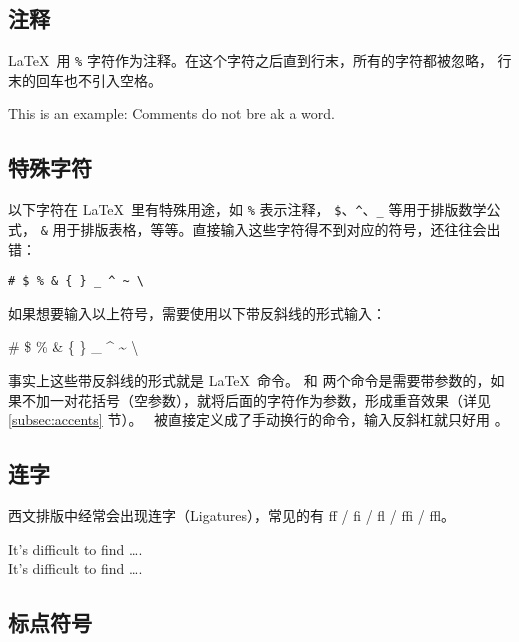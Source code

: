 \subsection{注释}\label{subsec:comments}

\LaTeX\ 用 \texttt\% 字符作为注释。在这个字符之后直到行末，所有的字符都被忽略，
行末的回车也不引入空格。
\begin{example}
This is an %
example: Comments do not bre%
ak a word.
\end{example}

\subsection{特殊字符}\label{subsec:special-chars}

以下字符在 \LaTeX\ 里有特殊用途，如 \texttt\% 表示注释， \texttt\$、\texttt\textasciicircum 、\texttt\_ 等用于排版数学公式，
\texttt\& 用于排版表格，等等。直接输入这些字符得不到对应的符号，还往往会出错：
\begin{verbatim}
# $ % & { } _ ^ ~ \
\end{verbatim}

如果想要输入以上符号，需要使用以下带反斜线的形式输入：
\begin{example}
\# \$ \% \& \{ \} \_ 
\^{} \~{} \textbackslash
\end{example}

事实上这些带反斜线的形式就是 \LaTeX\ 命令。\cmd{\textasciicircum} 和 \cmd{\textasciitilde} 
两个命令是需要带参数的，如果不加一对花括号（空参数），就将后面的字符作为参数，形成重音效果（详见 \ref{subsec:accents} 节）。
\crcmd\ 被直接定义成了手动换行的命令，输入反斜杠就只好用 。

\subsection{连字}\label{subsec:ligatures}

西文排版中经常会出现连字（Ligatures），常见的有 ff / fi / fl / ffi / ffl{}。
\begin{example}
It's difficult to find \ldots .\\
It's dif{}f{}icult to f{}ind \ldots .
\end{example}

\subsection{标点符号}\label{subsec:punct}

